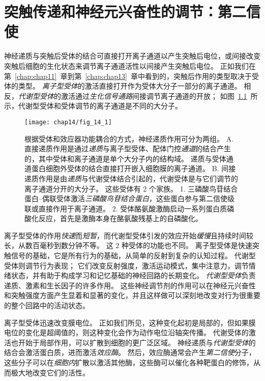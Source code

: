 \chapter{突触传递和神经元兴奋性的调节：第二信使} \label{chap:chap14}

神经递质与突触后受体的结合可直接打开离子通道以产生突触后电位，或间接改变突触后细胞的生化状态来调节离子通道活性以间接产生突触后电位。
正如我们在第~\ref{chap:chap11}~章到第~\ref{chap:chap13}~章中看到的，突触后作用的类型取决于受体的类型。
\textit{离子型受体}的激活直接打开作为受体大分子一部分的离子通道。
相反，\textit{代谢型受体}的激活通过\textit{生化信号通路}间接调节离子通道的开放；
如图~\ref{fig:14_1}~所示，代谢型受体和受体调节的离子通道是不同的大分子。


\begin{figure}[htbp]
	\centering
	\texttt{[image: chap14/fig\_14\_1]}
	\caption{根据受体和效应器功能耦合的方式，神经递质作用可分为两组。
		A. 直接递质作用是通过\textit{递质}与离子型受体、配体门控\textit{通道}的结合产生的，其中受体和离子通道是单个大分子内的结构域。
		递质与受体通道蛋白细胞外受体的结合直接打开嵌入细胞膜的离子通道。
		B. 间接递质作用是由\textit{递质}与代谢受体结合引起的，代谢受体是与它们调节的离子通道分开的大分子。
		这些受体有 2 个家族。
		1. 三磷酸鸟苷结合蛋白–偶联受体激活\textit{三磷酸鸟苷结合蛋白}，这些蛋白参与第二信使级联或直接作用于离子通道。
		2. 受体酪氨酸激酶启动一系列蛋白质磷酸化反应，首先是激酶本身在酪氨酸残基上的自磷酸化。}
	\label{fig:14_1}
\end{figure}


离子型受体的作用\textit{快速}而\textit{短暂}，而代谢型受体引发的效应开始\textit{缓慢}且持续时间较长，从数百毫秒到数分钟不等。
这 2 种受体的功能也不同。
离子型受体是快速突触信号的基础，它是所有行为的基础，从简单的反射到复杂的认知过程。
代谢型受体则调节行为表现；
它们改变反射强度，激活运动模式，集中注意力，调节情绪状态，并有助于构成学习和记忆基础的神经回路的长期变化。
\textit{代谢型受体}负责递质、激素和生长因子的许多作用。
这些神经调节剂的作用可以在神经元兴奋性和突触强度方面产生显着和显著的变化，并且这样做可以深刻地改变对行为很重要的整个回路中的活动状态。


离子型受体迅速改变膜电位。
正如我们所见，这种变化起初是局部的，但如果膜电位的变化是超阈值的，则这种变化会作为动作电位沿轴突传播。
代谢受体的激活也开始于局部作用，可以扩散到细胞的更广泛区域。
神经递质与\textit{代谢型受体}的结合会激活蛋白质，进而激活\textit{效应酶}。
然后，效应酶通常会产生\textit{第二信使}分子，这些分子可以在\textit{细胞内}扩散以激活其他酶，这些酶可以催化各种靶蛋白的修饰，从而极大地改变它们的活性。


